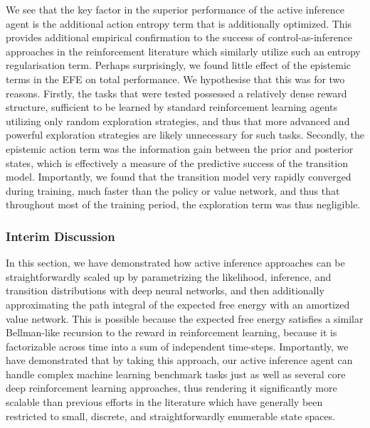  We see that the key factor in the superior performance of the active inference agent is the additional action entropy term that is additionally optimized. This provides additional empirical confirmation to the success of control-as-inference approaches in the reinforcement literature which similarly utilize such an entropy regularisation term. Perhaps surprisingly, we found little effect of the epistemic terms in the EFE on total performance. We hypothesise that this was for two reasons. Firstly, the tasks that were tested possessed a relatively dense reward structure, sufficient to be learned by standard reinforcement learning agents utilizing only random exploration strategies, and thus that more advanced and powerful exploration strategies are likely unnecessary for such tasks. Secondly, the epistemic action term was the information gain between the prior and posterior states, which is effectively a measure of the predictive success of the transition model. Importantly, we found that the transition model very rapidly converged during training, much faster than the policy or value network, and thus that throughout most of the training period, the exploration term was thus negligible.

\subsubsection{Interim Discussion}

In this section, we have demonstrated how active inference approaches can be straightforwardly scaled up by parametrizing the likelihood, inference, and transition distributions with deep neural networks, and then additionally approximating the path integral of the expected free energy with an amortized value network. This is possible because the expected free energy satisfies a similar Bellman-like recursion to the reward in reinforcement learning, because it is factorizable across time into a sum of independent time-steps. Importantly, we have demonstrated that by taking this approach, our active inference agent can handle complex machine learning benchmark tasks just as well as several core deep reinforcement learning approaches, thus rendering it significantly more scalable than previous efforts in the literature which have generally been restricted to small, discrete, and straightforwardly enumerable state spaces.

